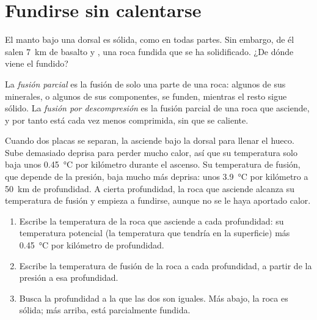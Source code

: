 \section{Fundirse sin calentarse}

El manto bajo una dorsal es  sólida, como en todas partes. Sin
embargo, de él salen \qty{7}{km} de basalto y , una roca fundida que se
ha solidificado. ¿De dónde viene el fundido?

\begin{definition}\label{def:g11:ocean-ridges:partial-melting}
La \emph{fusión parcial} es la fusión de solo una parte
de una roca: algunos de sus minerales, o algunos de sus componentes, se
funden, mientras el resto sigue sólido.
La \emph{fusión por descompresión} es la fusión parcial de una roca que asciende, y por tanto está cada
vez menos comprimida, sin que se caliente.
\end{definition}

Cuando dos placas se separan, la  asciende bajo la dorsal para
llenar el hueco. Sube demasiado deprisa para perder mucho calor, así que su
temperatura solo baja unos \qty{0.45}{\celsius} por kilómetro durante el
ascenso. Su temperatura de fusión, que depende de la presión, baja mucho más
deprisa: unos \qty{3.9}{\celsius} por kilómetro a \qty{50}{km} de
profundidad. A cierta profundidad, la roca que asciende alcanza su temperatura
de fusión y empieza a fundirse, aunque no se le haya aportado calor.

\begin{method}\label{met:g11:ocean-ridges:melting}
\begin{enumerate}
  \item Escribe la temperatura de la roca que asciende a cada profundidad: su
        temperatura potencial (la temperatura que tendría en la superficie)
        más \qty{0.45}{\celsius} por kilómetro de profundidad.
  \item Escribe la temperatura de fusión de la roca a cada profundidad, a
        partir de la presión a esa profundidad.
  \item Busca la profundidad a la que las dos son iguales. Más abajo, la roca
        es sólida; más arriba, está parcialmente fundida.
\end{enumerate}
\end{method}

